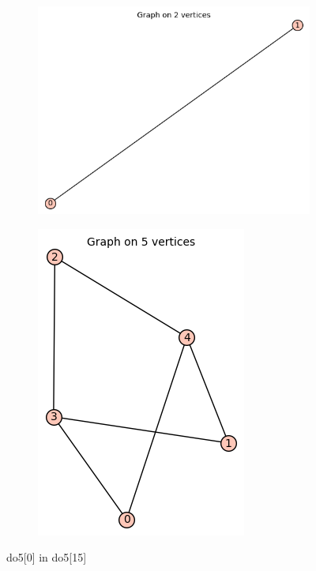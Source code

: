 \documentclass[12pt, a4paper]{article}
\begin{document}
\begin{center}
\begin{figure}
\centering
\begin{subfigure}{0.5\textwidth}
  \centering
  \includegraphics[width=0.5\linewidth]{do5[0]}
\end{subfigure}%
\begin{subfigure}{0.5\textwidth}
  \centering
  \includegraphics[width=0.5\linewidth]{do5[15]}
\end{subfigure}
\caption{do5[0] in do5[15]}
\label{fig:test}
\end{figure}


\end{center}
\end{document}
